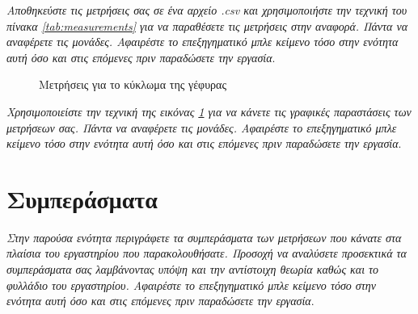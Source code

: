 \documentclass{article}
\begin{document}
\color{blue}
\textit{Αποθηκεύστε τις μετρήσεις σας σε ένα αρχείο .csv και χρησιμοποιήστε την τεχνική του πίνακα \ref{tab:measurements} για να παραθέσετε τις μετρήσεις στην αναφορά. Πάντα να αναφέρετε τις μονάδες.
Αφαιρέστε το επεξηγηματικό μπλε κείμενο τόσο στην ενότητα αυτή όσο και στις επόμενες πριν παραδώσετε την εργασία}.
\color{black}

\begin{figure}
\centering
{}
\caption{Μετρήσεις για το κύκλωμα της γέφυρας}
\label{fig:bridgeD}
\end{figure}

\color{blue}
\textit{Χρησιμοποιείστε την τεχνική της εικόνας \ref{fig:bridgeD} για να κάνετε τις γραφικές παραστάσεις των μετρήσεων σας. Πάντα να αναφέρετε τις μονάδες.
Αφαιρέστε το επεξηγηματικό μπλε κείμενο τόσο στην ενότητα αυτή όσο και στις επόμενες πριν παραδώσετε την εργασία}.
\color{black}
\section{Συμπεράσματα}
\color{blue}
\textit{Στην παρούσα ενότητα περιγράφετε τα συμπεράσματα των μετρήσεων που κάνατε στα πλαίσια του εργαστηρίου που παρακολουθήσατε. Προσοχή να αναλύσετε προσεκτικά τα συμπεράσματα σας λαμβάνοντας υπόψη και την αντίστοιχη θεωρία καθώς και το φυλλάδιο του εργαστηρίου. Αφαιρέστε το επεξηγηματικό μπλε κείμενο τόσο στην ενότητα αυτή όσο και στις επόμενες πριν παραδώσετε την εργασία}.
\color{black}
\end{document}
